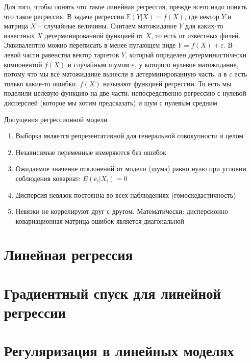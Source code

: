 \documentclass[a4paper, 14pt]{article}
\begin{document}
    Для того, чтобы понять что такое линейная регрессия, прежде всего надо понять что такое регрессия.
    В задаче регрессии $\mathbb{E}(Y|X) = f(X)$, где вектор $Y$ и матрица $X$ -- случайные величины.
    Считаем матожидание $Y$ для каких-то известных $X$ детерминированной функцией от $X$, то есть от известных фичей.
    Эквивалентно можно переписать в менее пугающем виде $Y = f(X) + \varepsilon$.
    В левой части равенства вектор таргетов $Y$, который определен детерминистически компонентой $f(X)$ и случайным
    шумом $\varepsilon$, у которого нулевое матожидание, потому что мы всё матожидание вынесли в детерминированную
    часть, а в $\varepsilon$ есть только какие-то ошибки.
    $f(X)$ называют функцией регрессии.
    То есть мы поделили целевую функцию на две части: непосредственно регрессию с нулевой дисперсией (которое мы хотим
    предсказать) и шум с нулевым средним
    
    Допущения регрессионной модели
    \begin{enumerate}
        \item Выборка является репрезентативной для генеральной совокупности в целом
        \item Независимые переменные измеряются без ошибок
        \item Ожидаемое значение отклонений от модели (шума) равно нулю при условии соблюдения ковариат: $E(e_i|X_i) =0$
        \item Дисперсия невязок постоянна во всех наблюдениях (гомоскедастичность)
        \item Невязки не коррелируют друг с другом.
        Математически: дисперсионно–ковариационная матрица ошибок является диагональной
    \end{enumerate}
    
    \section{Линейная регрессия}
    
    
    \section{Градиентный спуск для линейной регрессии}
    
    
    \section{Регуляризация в линейных моделях}
    
    
\end{document}
